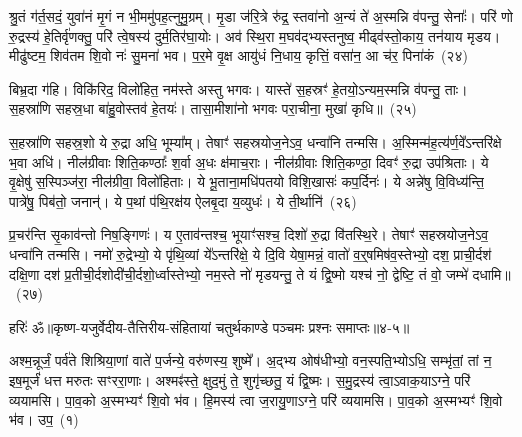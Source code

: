 श्रु॒तं ग॑र्त॒सदं॒ युवा॑नं मृ॒गं न भी॒ममु॑पह॒त्नुमु॒ग्रम्। मृ॒डा ज॑रि॒त्रे रु॑द्र॒ स्तवा॑नो अ॒न्यं ते॑ अ॒स्मन्नि व॑पन्तु॒ सेनाः᳚। परि॑ णो रु॒द्रस्य॑ हे॒तिर्वृ॑णक्तु॒ परि॑ त्वे॒षस्य॑ दुर्म॒तिर॑घा॒योः। अव॑ स्थि॒रा म॒घव॑द्भ्यस्तनुष्व॒ मीढ्व॑स्तो॒काय॒ तन॑याय मृडय। मीढु॑ष्टम॒ शिव॑तम शि॒वो नः॑ सु॒मना॑ भव। प॒र॒मे वृ॒क्ष आयु॑धं नि॒धाय॒ कृत्तिं॒ वसा॑न॒ आ च॑र॒ पिना॑कं~(२४)\ip

बिभ्र॒दा ग॑हि। विकि॑रिद॒ विलो॑हित॒ नम॑स्ते अस्तु भगवः। यास्ते॑ स॒हस्रꣳ॑ हे॒तयो॒\-ऽन्यम॒स्मन्नि व॑पन्तु॒ ताः। स॒हस्रा॑णि सहस्र॒धा बा॑हु॒वोस्तव॑ हे॒तयः॑। तासा॒मीशा॑नो भगवः परा॒चीना॒ मुखा॑ कृधि॥~(२५)\ip

{\anuvakamend[{अ॒स्मिꣴस्त॒नुवः॑ स्तु॒हि पिना॑क॒मेका॒न्नत्रि॒ꣳ॒शच्च॑}]}%

स॒हस्रा॑णि सहस्र॒शो ये रु॒द्रा अधि॒ भूम्या᳚म्। तेषाꣳ॑ सहस्रयोज॒ने\-ऽव॒ धन्वा॑नि तन्मसि। अ॒स्मिन्म॑ह॒त्य॑र्ण॒वे᳚\-ऽ\-न्तरि॑क्षे भ॒वा अधि॑। नील॑ग्रीवाः शिति॒कण्ठाः᳚ श॒र्वा अ॒धः क्ष॑माच॒राः। नील॑ग्रीवाः शिति॒कण्ठा॒ दिवꣳ॑ रु॒द्रा उप॑श्रिताः। ये वृ॒क्षेषु॑ स॒स्पिञ्ज॑रा॒ नील॑ग्रीवा॒ विलो॑हिताः। ये भू॒ताना॒मधि॑पतयो विशि॒खासः॑ कप॒र्दिनः॑। ये अन्ने॑षु वि॒विध्य॑न्ति॒ पात्रे॑षु॒ पिब॑तो॒ जनान्॑। ये प॒थां प॑थि॒रक्ष॑य ऐलबृ॒दा य॒व्युधः॑। ये ती॒र्थानि॑~(२६)\ip

प्र॒चर॑न्ति सृ॒काव॑न्तो निष॒ङ्गिणः॑। य ए॒ताव॑न्तश्च॒ भूयाꣳ॑सश्च॒ दिशो॑ रु॒द्रा वि॑तस्थि॒रे। तेषाꣳ॑ सहस्रयोज॒ने\-ऽव॒ धन्वा॑नि तन्मसि। नमो॑ रु॒द्रेभ्यो॒ ये पृ॑थि॒व्यां ये᳚\-ऽन्तरि॑क्षे॒ ये दि॒वि येषा॒मन्नं॒ वातो॑ व॒र्॒\mbox{}षमिष॑व॒स्तेभ्यो॒ दश॒ प्राची॒र्दश॑ दक्षि॒णा दश॑ प्र॒तीची॒र्दशोदी॑ची॒र्दशो॒र्ध्वास्तेभ्यो॒ नम॒स्ते नो॑ मृडयन्तु॒ ते यं द्वि॒ष्मो यश्च॑ नो॒ द्वेष्टि॒ तं वो॒ जम्भे॑ दधामि॥~(२७)\ip

{\anuvakamend[{ती॒र्थानि॒ यश्च॒ षट्च॑}]}%

{हरिः॑ ॐ}{॥कृष्ण-यजुर्वेदीय-तैत्तिरीय-संहितायां चतुर्थकाण्डे पञ्चमः प्रश्नः समाप्तः॥४-५॥}



\setcounter{anuvakam}{0}
अश्म॒न्नूर्जं॒ पर्व॑ते शिश्रिया॒णां वाते॑ प॒र्जन्ये॒ वरु॑णस्य॒ शुष्मे᳚। अ॒द्भ्य ओष॑धीभ्यो॒ वन॒स्पति॒भ्यो\-ऽधि॒ सम्भृ॑तां॒ तां न॒ इष॒मूर्जं॑ धत्त मरुतः सꣳररा॒णाः। अश्मꣴ॑स्ते॒ क्षुद॒मुं ते॒ शुगृ॑च्छतु॒ यं द्वि॒ष्मः। स॒मु॒द्रस्य॑ त्वा॒\-ऽवाक॒या\-ऽ\-ग्ने॒ परि॑ व्ययामसि। पा॒व॒को अ॒स्मभ्यꣳ॑ शि॒वो भ॑व। हि॒मस्य॑ त्वा ज॒रायु॒णा\-ऽ\-ग्ने॒ परि॑ व्ययामसि। पा॒व॒को अ॒स्मभ्यꣳ॑ शि॒वो भ॑व। उप॒~(१)\ip

